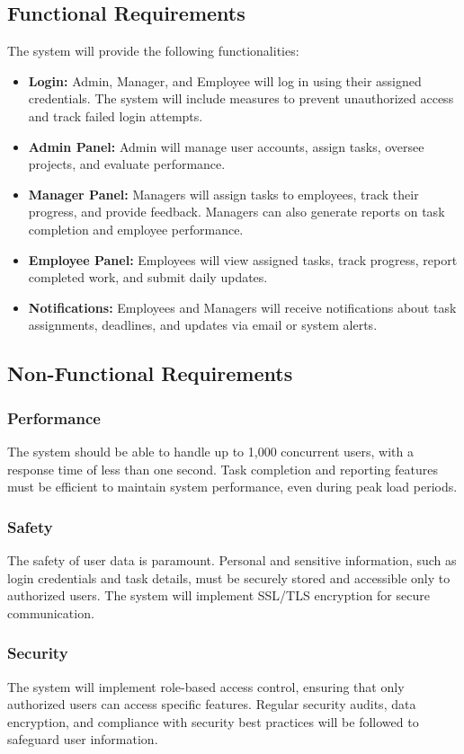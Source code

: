 \documentclass[a4paper,12pt]{article}
\begin{document}
\subsection{Functional Requirements}
The system will provide the following functionalities:
\begin{itemize}
    \item \textbf{Login:} Admin, Manager, and Employee will log in using their assigned credentials. The system will include measures to prevent unauthorized access and track failed login attempts.
    \item \textbf{Admin Panel:} Admin will manage user accounts, assign tasks, oversee projects, and evaluate performance.
    \item \textbf{Manager Panel:} Managers will assign tasks to employees, track their progress, and provide feedback. Managers can also generate reports on task completion and employee performance.
    \item \textbf{Employee Panel:} Employees will view assigned tasks, track progress, report completed work, and submit daily updates.
    \item \textbf{Notifications:} Employees and Managers will receive notifications about task assignments, deadlines, and updates via email or system alerts.
\end{itemize}
\subsection{Non-Functional Requirements}

\subsubsection{Performance}
The system should be able to handle up to 1,000 concurrent users, with a response time of less than one second. Task completion and reporting features must be efficient to maintain system performance, even during peak load periods.

\subsubsection{Safety}
The safety of user data is paramount. Personal and sensitive information, such as login credentials and task details, must be securely stored and accessible only to authorized users. The system will implement SSL/TLS encryption for secure communication.

\subsubsection{Security}
The system will implement role-based access control, ensuring that only authorized users can access specific features. Regular security audits, data encryption, and compliance with security best practices will be followed to safeguard user information.
\end{document}
